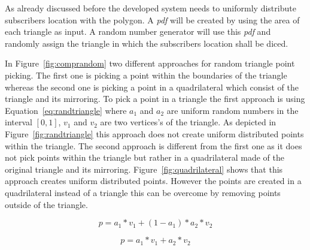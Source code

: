 \documentclass[master,english]{hgbthesis}
\begin{document}
As already discussed before the developed system needs to uniformly distribute subscribers location with the polygon. A \emph{pdf} will be created by using the area of each triangle as input. A random number generator will use this \emph{pdf} and randomly assign the triangle in which the subscribers location shall be diced.

In Figure~\ref{fig:comprandom} two different approaches for random triangle point picking. The first one is picking a point within the boundaries of the triangle whereas the second one is picking a  point in a  quadrilateral which consist of the triangle and its mirroring. To pick a point in a triangle the first approach is using Equation~\ref{eq:randtriangle} where $a_1$ and $a_2$ are uniform random numbers in the interval $ \left[0,1 \right] $, $v_1$ and $v_2$ are two vertices's of the triangle. As depicted in Figure~\ref{fig:randtriangle} this approach does not create uniform distributed points within the triangle. The second approach is different from the first one as it does not pick points within the triangle but rather in a quadrilateral made of the original triangle and its mirroring. Figure~\ref{fig:quadrilateral} shows that this approach creates uniform distributed points. However the points are created in a quadrilateral instead of a triangle this can be overcome by removing points outside of the triangle.

\begin{equation}

	p=a_1*v_1+(1-a_1)*a_2*v_2

	\label{eq:randtriangle}

\end{equation}

\begin{equation}

	p=a_1*v_1+a_2*v_2

	\label{eq:randquad}

\end{equation}
\end{document}
